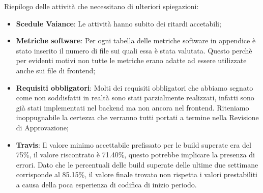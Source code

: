 
Riepilogo delle attività che necessitano di ulteriori spiegazioni:
\begin{itemize}
    \item \textbf{Scedule Vaiance}: Le attività hanno subito dei ritardi accetabili;
    \item \textbf{Metriche software}: Per ogni tabella delle metriche software in appendice è stato inserito 
    il numero di file sui quali essa è stata valutata.
    Questo perchè per evidenti motivi non tutte le metriche erano adatte ad essere utilizzate anche 
    sui file di frontend;
    \item \textbf{Requisiti obbligatori}: Molti dei requisiti obbligatori che abbiamo segnato come non 
    soddisfatti in realtà sono stati parzialmente realizzati, infatti sono già stati implementati nel
    backend ma non ancora nel frontend. Riteniamo inoppugnabile la certezza che verranno tutti portati 
    a termine nella Revisione di Approvazione;
    \item \textbf{Travis}: Il valore minimo accettabile prefissato per le build superate era del 75\%, il valore riscontrato
    è 71.40\%, questo potrebbe implicare la presenza di errori. Dato che le percentuali delle
    build superate delle ultime due settimane corrisponde al 85.15\%, il valore finale
    trovato non rispetta i valori prestabiliti a causa della poca esperienza di codifica di inizio periodo.
\end{itemize}
